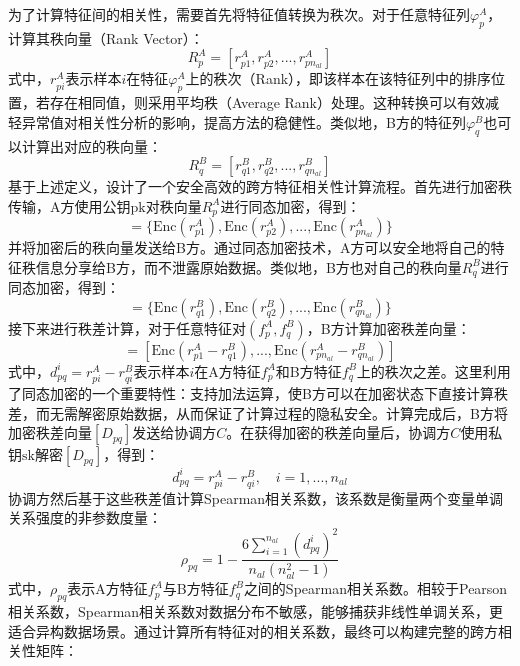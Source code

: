 为了计算特征间的相关性，需要首先将特征值转换为秩次。对于任意特征列$\varphi^A_p$，计算其秩向量（Rank Vector）：
\begin{equation}
	R^A_p = [r^A_{p1}, r^A_{p2}, ..., r^A_{pn_{al}}]
\end{equation}
式中，$r^A_{pi}$表示样本$i$在特征$\varphi^A_p$上的秩次（Rank），即该样本在该特征列中的排序位置，若存在相同值，则采用平均秩（Average Rank）处理。这种转换可以有效减轻异常值对相关性分析的影响，提高方法的稳健性。类似地，B方的特征列$\varphi^B_q$也可以计算出对应的秩向量：
\begin{equation}
	R^B_q = [r^B_{q1}, r^B_{q2}, ..., r^B_{qn_{al}}]
\end{equation}
基于上述定义，设计了一个安全高效的跨方特征相关性计算流程。首先进行加密秩传输，A方使用公钥$\text{pk}$对秩向量$R^A_p$进行同态加密，得到：
\begin{equation}
	[R^A_p] = \{\text{Enc}(r^A_{p1}), \text{Enc}(r^A_{p2}), ..., \text{Enc}(r^A_{pn_{al}})\}
\end{equation}
并将加密后的秩向量发送给B方。通过同态加密技术，A方可以安全地将自己的特征秩信息分享给B方，而不泄露原始数据。类似地，B方也对自己的秩向量$R^B_q$进行同态加密，得到：
\begin{equation}
	[R^B_q] = \{\text{Enc}(r^B_{q1}), \text{Enc}(r^B_{q2}), ..., \text{Enc}(r^B_{qn_{al}})\}
\end{equation}
接下来进行秩差计算，对于任意特征对$(f^A_p, f^B_q)$，B方计算加密秩差向量：
\begin{equation}
	[D_{pq}] = \left[ \text{Enc}(r^A_{p1} - r^B_{q1}), ..., \text{Enc}(r^A_{pn_{al}} - r^B_{qn_{al}}) \right]
\end{equation}
式中，$d_{pq}^i = r^A_{pi} - r^B_{qi}$表示样本$i$在A方特征$f^A_p$和B方特征$f^B_q$上的秩次之差。这里利用了同态加密的一个重要特性：支持加法运算，使B方可以在加密状态下直接计算秩差，而无需解密原始数据，从而保证了计算过程的隐私安全。计算完成后，B方将加密秩差向量$[D_{pq}]$发送给协调方$C$。在获得加密的秩差向量后，协调方$C$使用私钥$\text{sk}$解密$[D_{pq}]$，得到：
\begin{equation}
	d_{pq}^i = r^A_{pi} - r^B_{qi}, \quad i = 1, ..., n_{al}
\end{equation}
协调方然后基于这些秩差值计算Spearman相关系数，该系数是衡量两个变量单调关系强度的非参数度量：
\begin{equation}
	\rho_{pq} = 1 - \frac{6\sum_{i=1}^{n_{al}} (d_{pq}^i)^2}{n_{al}(n_{al}^2 - 1)}
\end{equation}
式中，$\rho_{pq}$表示A方特征$f^A_p$与B方特征$f^B_q$之间的Spearman相关系数。相较于Pearson相关系数，Spearman相关系数对数据分布不敏感，能够捕获非线性单调关系，更适合异构数据场景。通过计算所有特征对的相关系数，最终可以构建完整的跨方相关性矩阵：
